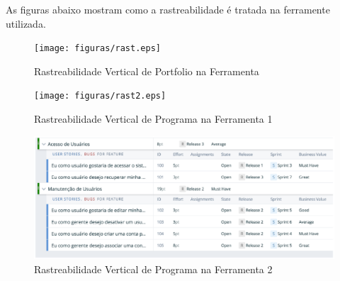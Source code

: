 As figuras abaixo mostram como a rastreabilidade é tratada na ferramente utilizada.

\begin{figure}[H]
    \centering
	\texttt{[image: figuras/rast.eps]}
    \caption{ Rastreabilidade Vertical de Portfolio na Ferramenta}
    \label{fig:ras}
\end{figure}

\begin{figure}[H]
    \centering
	\texttt{[image: figuras/rast2.eps]}
    \caption{Rastreabilidade Vertical de Programa na Ferramenta 1}
    \label{fig:ras2}
\end{figure}

\begin{figure}[H]
    \centering
	\includegraphics[keepaspectratio=true,scale=0.5]{figuras/fig1201.eps}
    \caption{Rastreabilidade Vertical de Programa na Ferramenta 2}
    \label{fig:ras2}
\end{figure}
